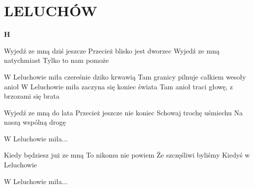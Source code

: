 \documentclass[../../../songbook.tex]{subfiles}
\begin{document}
\TabPositions{8cm} %
\section*{LELUCHÓW}
{}
\vspace{0.5cm}
{\color{red}\textbf{H} } \newline

Wyjedź ze mną dziś jeszcze 		 \newline
Przecież blisko jest dworzec 	 \newline
Wyjedź ze mną natychmiast 		 \newline
Tylko to nam pomoże 			 \newline

\-\hspace{0.8cm} W Leluchowie miła czereśnie dziko krwawią 	 \newline
\-\hspace{0.8cm} Tam granicy pilnuje całkiem wesoły anioł 	 \newline
\-\hspace{0.8cm} W Leluchowie miła zaczyna się koniec świata 	 \newline
\-\hspace{0.8cm} Tam anioł traci głowę, z brzozami się brata 	 \newline

Wyjedź ze mną do lata 		\newline
Przecież jeszcze nie koniec \newline
Schowaj trochę uśmiechu 	\newline
Na naszą wspólną drogę 		\newline

\-\hspace{0.8cm} W Leluchowie miła... \newline

Kiedy będziesz już ze mną	\newline
To nikomu nie powiem		\newline
Że szczęśliwi byliśmy		\newline
Kiedyś w Leluchowie			\newline

\-\hspace{0.8cm} W Leluchowie miła...
\end{document}

